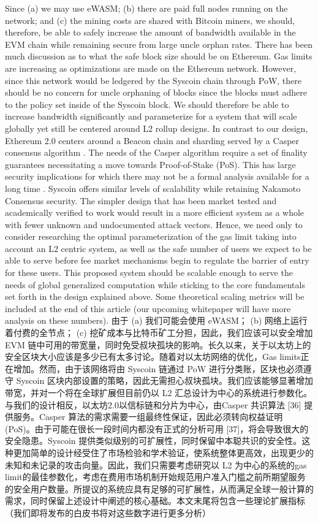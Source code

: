 \documentclass{ctexart}
\begin{document}
Since (a) we may use eWASM; (b) there are paid full nodes running on the network; and (c) the mining costs are shared with Bitcoin miners, we should, therefore, be able to safely increase the amount of bandwidth available in the EVM chain while remaining secure from large uncle orphan rates. There has been much discussion as to what the safe block size should be on Ethereum. Gas limits are increasing as optimizations are made on the Ethereum network. However, since this network would be ledgered by the Syscoin chain through PoW, there should be no concern for uncle orphaning of blocks since the blocks must adhere to the policy set inside of the Syscoin block. We should therefore be able to increase bandwidth significantly and parameterize for a system that will scale globally yet still be centered around L2 rollup designs. In contrast to our design, Ethereum 2.0 centers around a Beacon chain and sharding served by a Casper consensus algorithm \cite{But17}. The needs of the Casper algorithm require a set of finality guarantees necessitating a move towards Proof-of-Stake (PoS). This has large security implications for which there may not be a formal analysis available for a long time \cite{Neu21}. Syscoin offers similar levels of scalability while retaining Nakamoto Consensus security. The simpler design that has been market tested and academically verified to work would result in a more efficient system as a whole with fewer unknown and undocumented attack vectors. Hence, we need only to consider researching the optimal parameterization of the gas limit taking into account an L2 centric system, as well as the safe number of users we expect to be able to serve before fee market mechanisms begin to regulate the barrier of entry for these users. This proposed system should be scalable enough to serve the needs of global generalized computation while sticking to the core fundamentals set forth in the design explained above.  Some theoretical scaling metrics will be included at the end of this article (our upcoming whitepaper will have more analysis on these numbers). 由于 (a) 我们可能会使用 eWASM； (b) 网络上运行着付费的全节点； (c) 挖矿成本与比特币矿工分担，因此，我们应该可以安全增加 EVM 链中可用的带宽量，同时免受叔块孤块的影响。长久以来，关于以太坊上的安全区块大小应该是多少已有太多讨论。随着对以太坊网络的优化，Gas limits正在增加。然而，由于该网络将由 Syscoin 链通过 PoW 进行分类账，区块也必须遵守 Syscoin 区块内部设置的策略，因此无需担心叔块孤块。我们应该能够显著增加带宽，并对一个将在全球扩展但目前仍以 L2 汇总设计为中心的系统进行参数化。与我们的设计相反，以太坊2.0以信标链和分片为中心，由Casper 共识算法 [36] 提供服务。Casper 算法的需求需要一组最终性保证，因此必须转向权益证明 (PoS)。由于可能在很长一段时间内都没有正式的分析可用 [37]，将会导致很大的安全隐患。Syscoin 提供类似级别的可扩展性，同时保留中本聪共识的安全性。这种更加简单的设计经受住了市场检验和学术验证，使系统整体更高效，出现更少的未知和未记录的攻击向量。因此，我们只需要考虑研究以 L2 为中心的系统的gas limit的最佳参数化，考虑在费用市场机制开始规范用户准入门槛之前所期望服务的安全用户数量。所提议的系统应具有足够的可扩展性，从而满足全球一般计算的需求，同时保留上述设计中阐述的核心基础。本文末尾将包含一些理论扩展指标（我们即将发布的白皮书将对这些数字进行更多分析）
\end{document}
